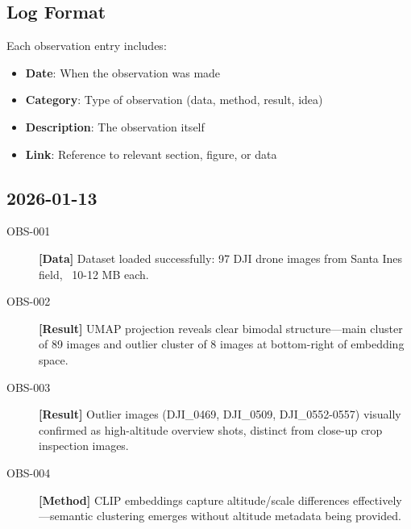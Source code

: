 

\subsection*{Log Format}
Each observation entry includes:
\begin{itemize}
    \item \textbf{Date}: When the observation was made
    \item \textbf{Category}: Type of observation (data, method, result, idea)
    \item \textbf{Description}: The observation itself
    \item \textbf{Link}: Reference to relevant section, figure, or data
\end{itemize}

\hrulefill

\subsection*{2026-01-13}

\begin{description}
    \item[OBS-001] \textbf{[Data]} Dataset loaded successfully: 97 DJI drone images from Santa Ines field, ~10-12 MB each.

    \item[OBS-002] \textbf{[Result]} UMAP projection reveals clear bimodal structure---main cluster of 89 images and outlier cluster of 8 images at bottom-right of embedding space.

    \item[OBS-003] \textbf{[Result]} Outlier images (DJI\_0469, DJI\_0509, DJI\_0552-0557) visually confirmed as high-altitude overview shots, distinct from close-up crop inspection images.

    \item[OBS-004] \textbf{[Method]} CLIP embeddings capture altitude/scale differences effectively---semantic clustering emerges without altitude metadata being provided.
\end{description}

